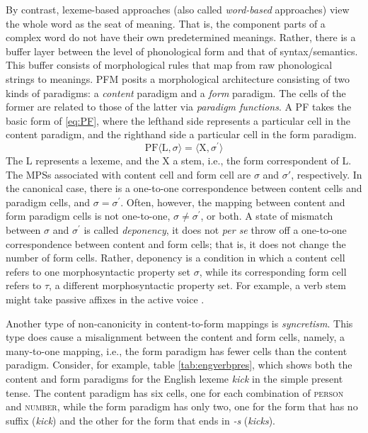 By contrast, lexeme-based approaches (also called \emph{word-based} 
approaches) view the whole word as the seat of meaning. That is, the component 
parts of a complex word do not have their own predetermined meanings. 
Rather, 
there is a buffer layer between the level of phonological form and that of 
syntax/semantics. This
buffer consists of morphological rules that map from raw phonological 
strings to meanings.
\ac{PFM} \citep{stump:2001} 
posits a morphological architecture consisting of two kinds of paradigms: a \emph{content} paradigm and a \emph{form} paradigm.
The cells of the former are related to those of the latter via
\emph{paradigm functions}.
A \ac{PF} takes the basic form of
\eqref{eq:PF}, where the lefthand side represents a particular cell in the 
content paradigm, and the righthand side a particular cell in the form paradigm. 
\begin{equation}
\label{eq:PF}
	\text{PF}\langle \text{L},\sigma \rangle = \langle \text{X}, \sigma^\prime \rangle
\end{equation}
The L represents a lexeme, and the X a stem,  i.e., the form correspondent of L. 
The \ac{MPS}s associated with content cell and form cell are $\sigma$ and 
$\sigma\prime$, respectively. In the canonical case, there is a one-to-one
correspondence between content cells and paradigm cells, and 
$\sigma = \sigma^\prime$.
Often, however, the mapping between content and form paradigm cells is 
not one-to-one, $\sigma \ne \sigma^\prime$, or both. A state of mismatch 
between $\sigma$ and 
$\sigma^\prime$ is called \emph{deponency}, it does not \emph{per se} 
throw off a one-to-one correspondence between content and form cells; 
that is, it does not change the number of form cells. Rather, deponency 
is a condition in which a content cell refers to one morphosyntactic property 
set $\sigma$, while its corresponding form cell refers to $\tau$, a different 
morphosyntactic property set. For example, a verb stem might take passive 
affixes in the active voice \citep{stewart-and-stump:2007}.

Another type of non-canonicity in content-to-form mappings is \emph{syncretism}. 
This type does cause a misalignment between the content and form cells, namely,
a many-to-one mapping, i.e., the form paradigm has fewer cells 
than the content paradigm. Consider, for example, table 
\ref{tab:engverbpres}, which shows both the content and form paradigms 
for the English lexeme \emph{kick} in the simple present tense.
The content paradigm has six cells, one for each combination of \textsc{person} 
and \textsc{number}, while the form paradigm has only two, one for the 
form that has no suffix (\textit{kick}) and the other for the form 
that ends in \textit{-s} (\textit{kicks}). 
 
